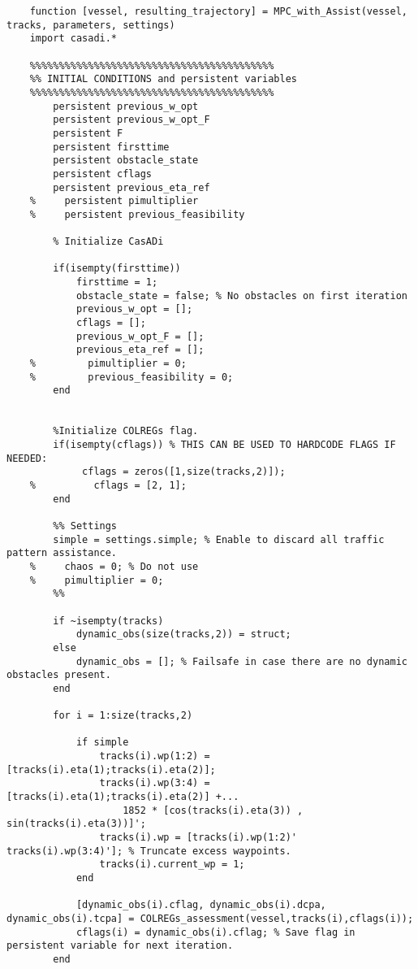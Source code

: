 \begin{lstlisting}
    function [vessel, resulting_trajectory] = MPC_with_Assist(vessel, tracks, parameters, settings)
    import casadi.*
    
    %%%%%%%%%%%%%%%%%%%%%%%%%%%%%%%%%%%%%%%%%%
    %% INITIAL CONDITIONS and persistent variables
    %%%%%%%%%%%%%%%%%%%%%%%%%%%%%%%%%%%%%%%%%%
        persistent previous_w_opt
        persistent previous_w_opt_F
        persistent F
        persistent firsttime
        persistent obstacle_state
        persistent cflags
        persistent previous_eta_ref
    %     persistent pimultiplier
    %     persistent previous_feasibility
           
        % Initialize CasADi
        
        if(isempty(firsttime))
            firsttime = 1;
            obstacle_state = false; % No obstacles on first iteration
            previous_w_opt = [];
            cflags = [];
            previous_w_opt_F = [];
            previous_eta_ref = [];
    %         pimultiplier = 0;
    %         previous_feasibility = 0;
        end
        
    
        %Initialize COLREGs flag.
        if(isempty(cflags)) % THIS CAN BE USED TO HARDCODE FLAGS IF NEEDED:
             cflags = zeros([1,size(tracks,2)]);
    %          cflags = [2, 1];
        end
    
        %% Settings
        simple = settings.simple; % Enable to discard all traffic pattern assistance.
    %     chaos = 0; % Do not use
    %     pimultiplier = 0;
        %%
        
        if ~isempty(tracks)
            dynamic_obs(size(tracks,2)) = struct;
        else
            dynamic_obs = []; % Failsafe in case there are no dynamic obstacles present.
        end
        
        for i = 1:size(tracks,2)
            
            if simple
                tracks(i).wp(1:2) = [tracks(i).eta(1);tracks(i).eta(2)];
                tracks(i).wp(3:4) = [tracks(i).eta(1);tracks(i).eta(2)] +...
                    1852 * [cos(tracks(i).eta(3)) , sin(tracks(i).eta(3))]';
                tracks(i).wp = [tracks(i).wp(1:2)' tracks(i).wp(3:4)']; % Truncate excess waypoints.
                tracks(i).current_wp = 1;
            end
        
            [dynamic_obs(i).cflag, dynamic_obs(i).dcpa, dynamic_obs(i).tcpa] = COLREGs_assessment(vessel,tracks(i),cflags(i));
            cflags(i) = dynamic_obs(i).cflag; % Save flag in persistent variable for next iteration.
        end
    

\end{lstlisting}

